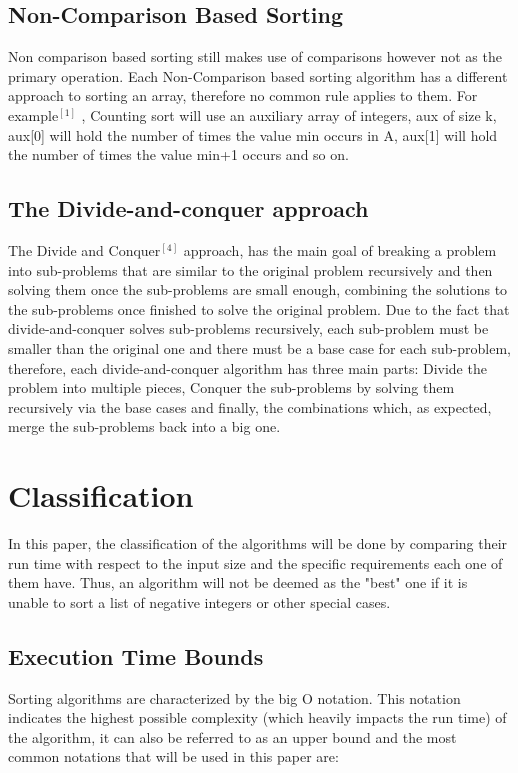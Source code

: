 \documentclass{article}
\begin{document}
\subsection{Non-Comparison Based Sorting}
Non comparison based sorting still makes use of comparisons however not as the primary operation. Each Non-Comparison based sorting algorithm has a different approach to sorting an array, therefore no common rule applies to them. For example$^{[1]}$ , Counting sort will use an auxiliary array of integers, aux of size k, aux[0] will hold the number of times the value min occurs in A, aux[1] will hold the number of times the value min+1 occurs and so on.

\subsection{The Divide-and-conquer approach}
The Divide and Conquer$^{[4]}$ approach, has the main goal of breaking a problem into sub-problems that are similar to the original problem recursively and then solving them once the sub-problems are small enough, combining the solutions to the sub-problems once finished to solve the original problem. Due to the fact that divide-and-conquer solves sub-problems recursively, each sub-problem must be smaller than the original one and there must be a base case for each sub-problem, therefore, each divide-and-conquer algorithm has three main parts: Divide the problem into multiple pieces, Conquer the sub-problems by solving them recursively via the base cases and finally, the combinations which, as expected, merge the sub-problems back into a big one.

\section{Classification}
In this paper, the classification of the algorithms will be done by comparing their run time with respect to the input size and the specific requirements each one of them have. Thus, an algorithm will not be deemed as the "best" one if it is unable to sort a list of negative integers or other special cases.

\subsection{Execution Time Bounds}
Sorting algorithms are characterized by the big O notation. This notation indicates the highest possible complexity (which heavily impacts the run time) of the algorithm, it can also be referred to as an upper bound and the most common notations that will be used in this paper are:
\end{document}
